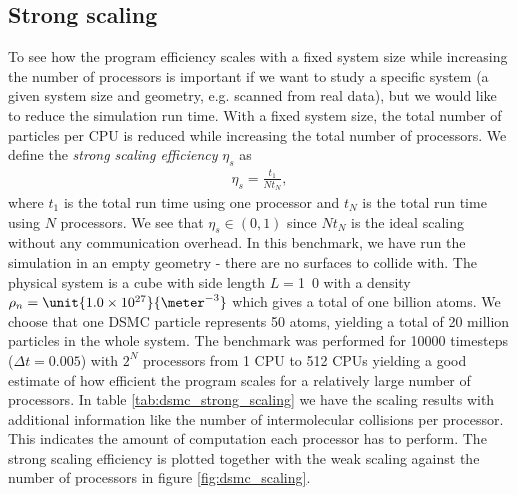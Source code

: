 \subsection{Strong scaling}
To see how the program efficiency scales with a fixed system size while increasing the number of processors is important if we want to study a specific system (a given system size and geometry, e.g. scanned from real data), but we would like to reduce the simulation run time. With a fixed system size, the total number of particles per CPU is reduced while increasing the total number of processors. We define the \textit{strong scaling efficiency} $\eta_s$ as
\begin{align}
	\eta_s = \frac{t_1}{Nt_N},
\end{align}
where $t_1$ is the total run time using one processor and $t_N$ is the total run time using $N$ processors. We see that $\eta_s\in (0,1)$ since $Nt_N$ is the ideal scaling without any communication overhead. In this benchmark, we have run the simulation in an empty geometry - there are no surfaces to collide with. The physical system is a cube with side length $L=$\unit{1.0}{\micro\meter} with a density $\rho_n=\unit{1.0\e{27}}{\meter^{-3}}$ which gives a total of one billion atoms. We choose that one DSMC particle represents 50 atoms, yielding a total of 20 million particles in the whole system. The benchmark was performed for 10000 timesteps ($\Delta t = 0.005$) with $2^N$ processors from 1 CPU to 512 CPUs yielding a good estimate of how efficient the program scales for a relatively large number of processors. In table \ref{tab:dsmc_strong_scaling} we have the scaling results with additional information like the number of intermolecular collisions per processor. This indicates the amount of computation each processor has to perform. The strong scaling efficiency is plotted together with the weak scaling against the number of processors in figure \ref{fig:dsmc_scaling}. 
